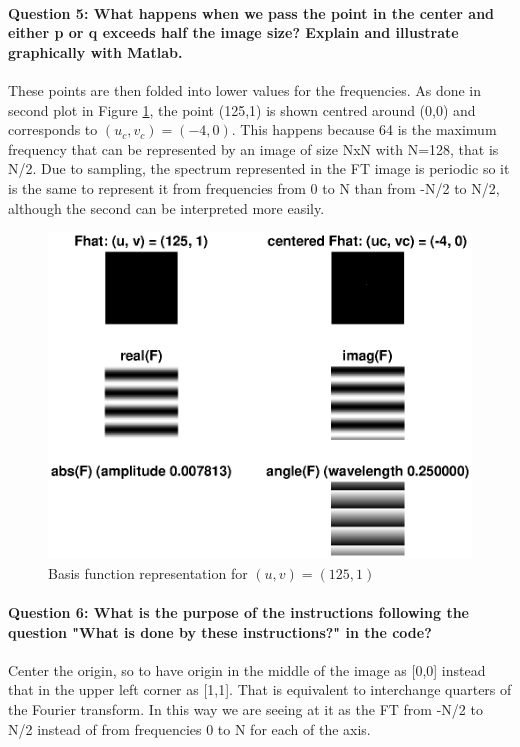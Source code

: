 \documentclass[12pt]{article}
\begin{document}
\paragraph{Question 5: What happens when we pass the point in the center and either p or q exceeds half the image size? Explain and illustrate graphically with Matlab.}
These points are then folded into lower values for the frequencies. As done in second plot in Figure \ref{fig:q5}, the point (125,1) is shown centred around (0,0) and corresponds to \((u_c,v_c)=(-4,0)\). This happens because 64 is the maximum frequency that can be represented by an image of size NxN with N=128, that is N/2. Due to sampling, the spectrum represented in the FT image is periodic so it is the same to represent it from frequencies from 0 to N than from -N/2 to N/2, although the second can be interpreted more easily.
\begin{figure}[htbp]
 \centering
 \includegraphics[width=\textwidth]{q5}
 \caption{Basis function representation for \((u,v)=(125,1)\)}
 \label{fig:q5}
\end{figure}

\paragraph{Question 6: What is the purpose of the instructions following the question "What is done
by these instructions?" in the code?} Center the origin, so to have origin in the middle of
the image as [0,0] instead that in the upper left corner as [1,1]. That is equivalent to interchange quarters of the Fourier transform. In this way we are seeing at it as the FT from -N/2 to N/2 instead of from frequencies 0 to N for each of the axis.
\end{document}
